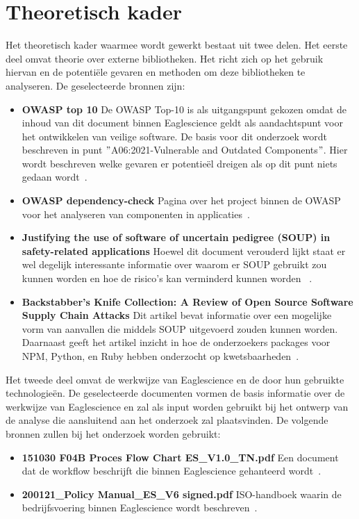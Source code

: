 \section{Theoretisch kader}\label{sec:theoretisch-kader}
Het theoretisch kader waarmee wordt gewerkt bestaat uit twee delen. Het eerste deel omvat theorie over externe bibliotheken. Het richt zich op het gebruik hiervan en de potentiële gevaren en methoden om deze bibliotheken te analyseren. De geselecteerde bronnen zijn:
\begin{itemize}
    \item \textbf{OWASP top 10}
    De OWASP Top-10 is als uitgangspunt gekozen omdat de inhoud van dit document binnen Eaglescience geldt als aandachtspunt voor het ontwikkelen van veilige software. De basis voor dit onderzoek wordt beschreven in punt $"$A06:2021-Vulnerable and Outdated Components$"$. Hier wordt beschreven welke gevaren er potentieël dreigen als op dit punt niets gedaan wordt~\citep{OWASP:2021}.
    \item \textbf{OWASP dependency-check} Pagina over het project binnen de OWASP voor het analyseren van componenten in applicaties~\citep{OWASP:2017}.
    \item \textbf{Justifying the use of software of uncertain pedigree (SOUP) in safety-related applications} Hoewel dit document verouderd lijkt staat er wel degelijk interessante informatie over waarom er SOUP gebruikt zou kunnen worden en hoe de risico's kan verminderd kunnen worden~\citep{Bischop:2001} .
    \item \textbf{Backstabber’s Knife Collection: A Review of Open Source Software Supply Chain Attacks} Dit artikel bevat informatie over een mogelijke vorm van aanvallen die middels SOUP uitgevoerd zouden kunnen worden. Daarnaast geeft het artikel inzicht in hoe de onderzoekers packages voor NPM, Python, en Ruby hebben onderzocht op kwetsbaarheden~\citep{Ohm:2020}.
\end{itemize}
Het tweede deel omvat de werkwijze van Eaglescience en de door hun gebruikte technologieën. De geselecteerde documenten vormen de basis informatie over de werkwijze van Eaglescience en zal als input worden gebruikt bij het ontwerp van de analyse die aansluitend aan het onderzoek zal plaatsvinden. De volgende bronnen zullen bij het onderzoek worden gebruikt:
\begin{itemize}
    \item \textbf{151030 F04B Proces Flow Chart ES\_V1.0\_TN.pdf} Een document dat de workflow beschrijft die binnen Eaglescience gehanteerd wordt~\citep{Eaglescience:2015}.
    \item \textbf{200121\_Policy Manual\_ES\_V6 signed.pdf} ISO-handboek waarin de bedrijfsvoering binnen Eaglescience wordt beschreven~\citep{Eaglescience:2020}.
\end{itemize}

